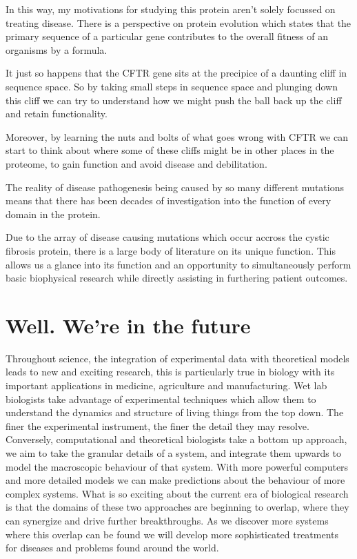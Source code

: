 In this way, my motivations for studying this protein aren't solely focussed on treating disease. There is a perspective on protein evolution which states that the primary sequence of a particular gene contributes to the overall fitness of an organisms by a formula. \cite{}


It just so happens that the CFTR gene sits at the precipice of a daunting cliff in sequence space. So by taking small steps in sequence space and plunging down this cliff we can try to understand how we might push the ball back up the cliff and retain functionality.

Moreover, by learning the nuts and bolts of what goes wrong with CFTR we can start to think about where some of these cliffs might be in other places in the proteome, to gain function and avoid disease and debilitation.

The reality of disease pathogenesis being caused by so many different mutations means that there has been decades of investigation into the function of every domain in the protein. 

Due to the array of disease causing mutations which occur accross the cystic fibrosis protein, there is a large body of literature on its unique function. This allows us a glance into its function and an opportunity to simultaneously perform basic biophysical research while directly assisting in furthering patient outcomes.  

\section{Well. We're in the future}
Throughout science, the integration of experimental data with theoretical models leads to new and exciting research, this is particularly true in biology with its important applications in medicine, agriculture and manufacturing. Wet lab biologists take advantage of experimental techniques which allow them to understand the dynamics and structure of living things from the top down. The finer the experimental instrument, the finer the detail they may resolve. Conversely, computational and theoretical biologists take a bottom up approach, we aim to take the granular details of a system, and integrate them upwards to model the macroscopic behaviour of that system. With more powerful computers and more detailed models we can make predictions about the behaviour of more complex systems. What is so exciting about the current era of biological research is that the domains of these two approaches are beginning to overlap, where they can synergize  and drive further breakthroughs. As we discover more systems where this overlap can be found we will develop more sophisticated treatments for diseases and problems found around the world.

